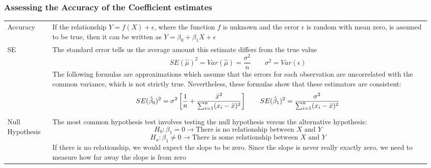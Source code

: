 \subsubsection{Assessing the Accuracy of the Coefficient estimates}
\begin{onehalfspace}
	\begin{tabularx}{\textwidth}{p{3cm}X}
		Accuracy & If the relationship $Y = f(X)+\epsilon$, where the function $f$ is unknown and the error $\epsilon$ is	random with mean zero, is assumed to be true, then it can be written as $Y = \beta_0+\beta_1 X+\epsilon$ \\
		SE & The standard error tells us the average amount this estimate differs from the true value
		\[ SE(\hat{\mu})^2 = Var(\hat{\mu}) = \frac{\sigma^2}{n} \qquad \sigma^2 = Var(\epsilon) \]
		The following formulas are approximations which assume that the errors for each observation are uncorrelated with	the common variance, which is not strictly true. Nevertheless, these formulas show that these estimators are	consistent:
		\[ SE(\hat{\beta}_0)^2 = \sigma^2 \left[ \frac{1}{n}+\frac{\bar{x}^2}{\sum_{i=1}^{n}(x_i-\bar{x})^2} \right] \qquad
		SE(\hat{\beta}_1)^2 = \frac{\sigma^2}{\sum_{i=1}^{n} (x_i-\bar{x})^2}  \] \\
		Null Hypothesis & The most common hypothesis test involves testing the null hypothesis versus the alternative	hypothesis: \[ H_0 : \beta_1 = 0 \rightarrow \text{There is no relationship between } X \text{ and } Y \]
		\[ H_a : \beta_1 \neq 0 \rightarrow \text{There is some relationship between } X \text{ and } Y \]
		If there is no relationship, we would expect the slope to be zero. Since the slope is never really exactly zero, we need to measure how far away the slope is from zero\\
	\end{tabularx}


\end{onehalfspace}
